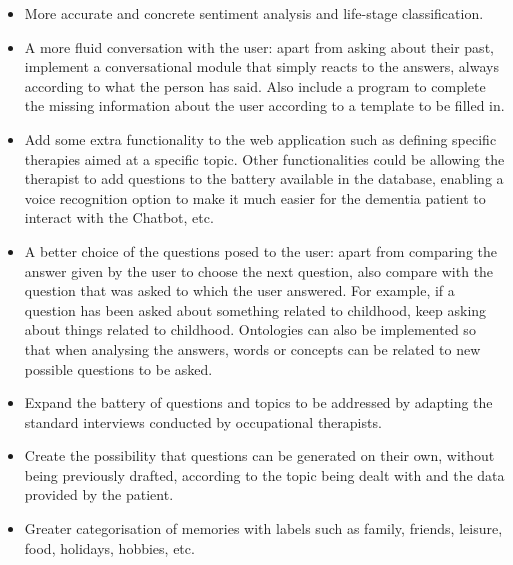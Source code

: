 \begin{itemize}
	\item More accurate and concrete sentiment analysis and life-stage classification.
	\item A more fluid conversation with the user: apart from asking about their past, implement a conversational module that simply reacts to the answers, always according to what the person has said. Also include a program to complete the missing information about the user according to a template to be filled in.
	\item Add some extra functionality to the web application such as defining specific therapies aimed at a specific topic. Other functionalities could be allowing the therapist to add questions to the battery available in the database, enabling a voice recognition option to make it much easier for the dementia patient to interact with the Chatbot, etc.
	\item A better choice of the questions posed to the user: apart from comparing the answer given by the user to choose the next question, also compare with the question that was asked to which the user answered. For example, if a question has been asked about something related to childhood, keep asking about things related to childhood. Ontologies can also be implemented so that when analysing the answers, words or concepts can be related to new possible questions to be asked.
	\item Expand the battery of questions and topics to be addressed by adapting the standard interviews conducted by occupational therapists.
	\item Create the possibility that questions can be generated on their own, without being previously drafted, according to the topic being dealt with and the data provided by the patient.
	\item Greater categorisation of memories with labels such as family, friends, leisure, food, holidays, hobbies, etc.
\end{itemize}














